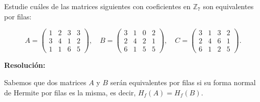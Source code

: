 \documentclass[a4paper,12pt]{article}
\begin{document}
\begin{ejercicio}[title=Ejercicio 11]
Estudie cuáles de las matrices siguientes con coeficientes en $\mathbb{Z}_7$ son equivalentes por filas:

\[
A =
\begin{pmatrix}
1 & 2 & 3 & 3\\
3 & 4 & 1 & 2\\
1 & 1 & 6 & 5
\end{pmatrix}, \quad
B =
\begin{pmatrix}
3 & 1 & 0 & 2\\
2 & 4 & 2 & 1\\
6 & 1 & 5 & 5
\end{pmatrix}, \quad
C =
\begin{pmatrix}
3 & 1 & 3 & 2\\
2 & 4 & 6 & 1\\
6 & 1 & 2 & 5
\end{pmatrix}.
\]

\tcblower
\textbf{Resolución:}

Sabemos que dos matrices $A$ y $B$ serán equivalentes por filas si su forma normal de Hermite por filas es la misma, es decir, $H_f(A)=H_f(B)$.

\vspace{0.5em}


\end{ejercicio}
\end{document}
